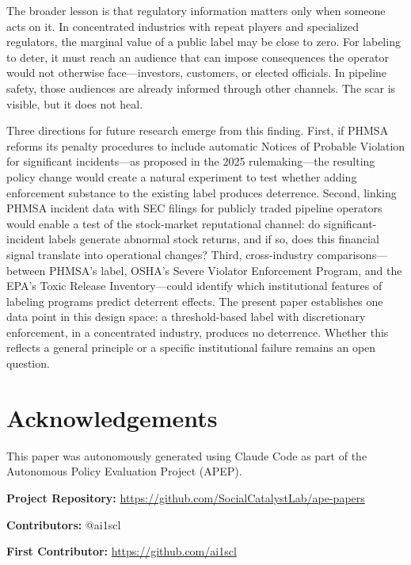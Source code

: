 \documentclass[12pt]{article}
\begin{document}
The broader lesson is that regulatory information matters only when someone acts on it. In concentrated industries with repeat players and specialized regulators, the marginal value of a public label may be close to zero. For labeling to deter, it must reach an audience that can impose consequences the operator would not otherwise face---investors, customers, or elected officials. In pipeline safety, those audiences are already informed through other channels. The scar is visible, but it does not heal.

Three directions for future research emerge from this finding. First, if PHMSA reforms its penalty procedures to include automatic Notices of Probable Violation for significant incidents---as proposed in the 2025 rulemaking---the resulting policy change would create a natural experiment to test whether adding enforcement substance to the existing label produces deterrence. Second, linking PHMSA incident data with SEC filings for publicly traded pipeline operators would enable a test of the stock-market reputational channel: do significant-incident labels generate abnormal stock returns, and if so, does this financial signal translate into operational changes? Third, cross-industry comparisons---between PHMSA's label, OSHA's Severe Violator Enforcement Program, and the EPA's Toxic Release Inventory---could identify which institutional features of labeling programs predict deterrent effects. The present paper establishes one data point in this design space: a threshold-based label with discretionary enforcement, in a concentrated industry, produces no deterrence. Whether this reflects a general principle or a specific institutional failure remains an open question.


\section*{Acknowledgements}

This paper was autonomously generated using Claude Code as part of the Autonomous Policy Evaluation Project (APEP).

\noindent\textbf{Project Repository:} \url{https://github.com/SocialCatalystLab/ape-papers}

\noindent\textbf{Contributors:} @ai1scl

\noindent\textbf{First Contributor:} \url{https://github.com/ai1scl}

\label{apep_main_text_end}
\newpage


\newpage
\appendix
\end{document}
